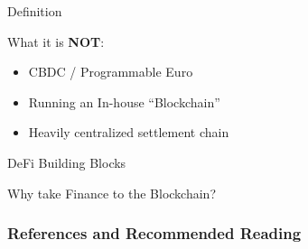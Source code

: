 \documentclass[handout]{beamer}
\begin{document}


\begin{frame}{Definition}

What it is \textbf{NOT}:
	\vspace{3em}
	\begin{itemize}
		\item<2-> CBDC / Programmable Euro
		\item<3-> Running an In-house “Blockchain”
		\item<4-> Heavily centralized settlement chain
	\end{itemize}
	
\end{frame}


\begin{frame}{DeFi Building Blocks}
\end{frame}


\begin{frame}{Why take Finance to the Blockchain?}
	
	\scalebox{0.85}{
	\begin{tikzpicture}
		
		
	\end{tikzpicture}
	}
\end{frame}



\begin{frame}%
\frametitle{References and Recommended Reading}
\nocite{FS:21}
	
	
 
\end{frame}
\end{document}
